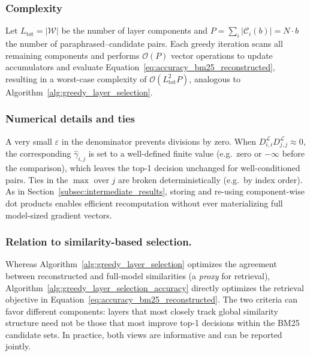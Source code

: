 \subsubsection{Complexity}
Let $L_\text{tot}=|\mathcal{W}|$ be the number of layer components and $P=\sum_{i}|\mathcal{C}_i(b)|=N\cdot b$ the number of paraphrased–candidate pairs. Each greedy iteration scans all remaining components and performs $\mathcal{O}(P)$ vector operations to update accumulators and evaluate Equation~\ref{eq:accuracy_bm25_reconstructed}, resulting in a worst-case complexity of $\mathcal{O}(L_\text{tot}^2 P)$, analogous to Algorithm~\ref{alg:greedy_layer_selection}.

\subsubsection{Numerical details and ties}
A very small $\varepsilon$ in the denominator prevents divisions by zero. When $D^{\mathcal{L}}_{i,i}D^{\mathcal{L}}_{j,j}\approx 0$, the corresponding $\hat{\gamma}_{i,j}$ is set to a well-defined finite value (e.g.\ zero or $-\infty$ before the comparison), which leaves the top-1 decision unchanged for well-conditioned pairs. Ties in the $\max$ over $j$ are broken deterministically (e.g.\ by index order). As in Section~\ref{subsec:intermediate_results}, storing and re-using component-wise dot products enables efficient recomputation without ever materializing full model-sized gradient vectors.

\subsubsection{Relation to similarity-based selection.}
Whereas Algorithm~\ref{alg:greedy_layer_selection} optimizes the agreement between reconstructed and full-model similarities (a \emph{proxy} for retrieval), Algorithm~\ref{alg:greedy_layer_selection_accuracy} directly optimizes the retrieval objective in Equation~\ref{eq:accuracy_bm25_reconstructed}. The two criteria can favor different components: layers that most closely track global similarity structure need not be those that most improve top-1 decisions within the BM25 candidate sets. In practice, both views are informative and can be reported jointly. 

